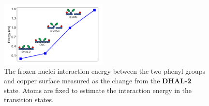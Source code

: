 \documentclass[%
 reprint,
 amsmath,amssymb,
 aps,
prb,
floatfix,
]{revtex4-2}
\newcommand{\comm}{\color{ForestGreen}} %
\begin{document}
\begin{figure}[hbt]
\centering
\includegraphics[width=0.48\textwidth]{Fig/onlysurface.pdf}
\caption{
The frozen-nuclei interaction energy between the two phenyl groups and copper surface measured as the change from the \textbf{DHAL-2} state. Atoms are fixed to estimate the interaction energy in the transition states. 
}
\label{fig:onlysurface}
\end{figure}
\end{document}
